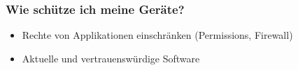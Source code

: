 \begin{frame}
    \frametitle{Wie schütze ich meine Geräte?}
    \begin{itemize}
      \item Rechte von Applikationen einschränken (Permissions, Firewall)
      \item Aktuelle und vertrauenswürdige Software
    \end{itemize}
\end{frame}
